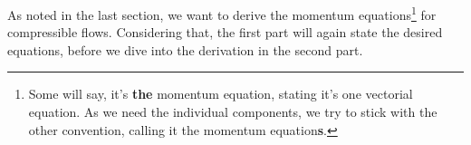 As noted in the last section, we want to derive the momentum equations\footnote{Some will say, it's \textbf{the} momentum equation, stating it's one vectorial equation.
As we need the individual components, we try to stick with the other convention, calling it the momentum equation\textbf{s}.} for compressible flows.
Considering that, the first part will again state the desired equations, before we dive into the derivation in the second part.
